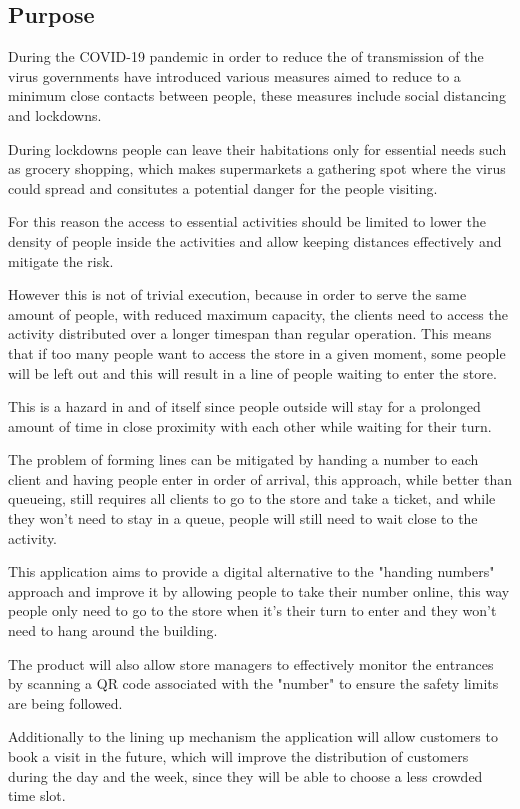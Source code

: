 \subsection{Purpose}

During the COVID-19 pandemic in order to reduce the of transmission of the virus governments have introduced various measures aimed to reduce to a minimum close contacts between people, these measures include social distancing and lockdowns.

During lockdowns people can leave their habitations only for essential needs such as grocery shopping, which makes supermarkets a gathering spot where the virus could spread and consitutes a potential danger for the people visiting.

For this reason the access to essential activities should be limited to lower the density of people inside the activities and allow keeping distances effectively and mitigate the risk.

However this is not of trivial execution, because in order to serve the same amount of people, with reduced maximum capacity, the clients need to access the activity distributed over a longer timespan than regular operation. This means that if too many people want to access the store in a given moment, some people will be left out and this will result in a line of people waiting to enter the store.

This is a hazard in and of itself since people outside will stay for a prolonged amount of time in close proximity with each other while waiting for their turn.

The problem of forming lines can be mitigated by handing a number to each client and having people enter in order of arrival, this approach, while better than queueing, still requires all clients to go to the store and take a ticket, and while they won't need to stay in a queue, people will still need to wait close to the activity.

This application aims to provide a digital alternative to the "handing numbers" approach and improve it by allowing people to take their number online, this way people only need to go to the store when it's their turn to enter and they won't need to hang around the building.

The product will also allow store managers to effectively monitor the entrances by scanning a QR code associated with the "number" to ensure the safety limits are being followed.

Additionally to the lining up mechanism the application will allow customers to book a visit in the future, which will improve the distribution of customers during the day and the week, since they will be able to choose a less crowded time slot.


